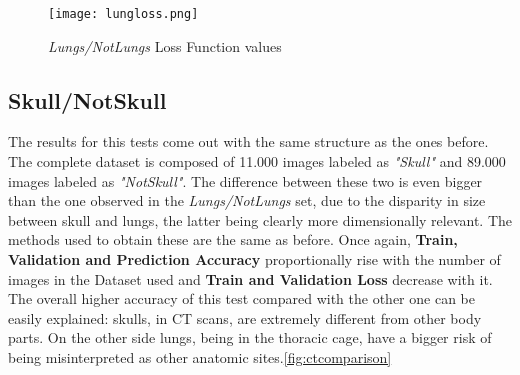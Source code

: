 \documentclass[../main.tex]{subfiles}
\begin{document}
\begin{figure}[h!b]
	\centering
	\texttt{[image: lungloss.png]}
	\caption{\textit{Lungs/NotLungs} Loss Function values}
	\label{fig:lungloss}
\end{figure}
\clearpage
\newpage

\begin{table}
\caption{\textit{Skull/Not Skull} Results}
\label{tab:SNSres}
\end{table}

\subsection{Skull/NotSkull}
The results for this tests come out with the same structure as the ones before. The complete dataset is composed of 11.000 images labeled as \textit{"Skull"} and 89.000 images labeled as \textit{"NotSkull"}. The difference between these two is even bigger than the one observed in the \textit{Lungs/NotLungs} set, due to the disparity in size between skull and lungs, the latter being clearly more dimensionally relevant. The methods used to obtain these are the same as before.
Once again, \textbf{Train, Validation and Prediction Accuracy} proportionally rise with the number of images in the Dataset used and \textbf{Train and Validation Loss} decrease with it. The overall higher accuracy of this test compared with the other one can be easily explained: skulls, in CT scans, are extremely different from other body parts. On the other side lungs, being in the thoracic cage, have a bigger risk of being misinterpreted as other anatomic sites.\ref{fig:ctcomparison} \\
\end{document}
